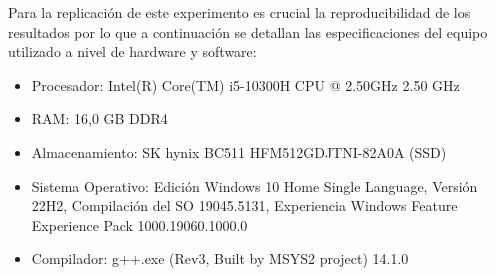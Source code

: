 
Para la replicación de este experimento es crucial la reproducibilidad de los resultados por lo que a continuación se detallan las especificaciones del equipo utilizado a nivel de hardware y software:

\begin{itemize}
    \item Procesador: Intel(R) Core(TM) i5-10300H CPU @ 2.50GHz 2.50 GHz
    \item RAM: 16,0 GB DDR4
    \item Almacenamiento: SK hynix BC511 HFM512GDJTNI-82A0A (SSD)
    \item Sistema Operativo: Edición Windows 10 Home Single Language, Versión	22H2, Compilación del SO 19045.5131, Experiencia Windows Feature Experience Pack 1000.19060.1000.0
    \item Compilador: g++.exe (Rev3, Built by MSYS2 project) 14.1.0
\end{itemize}
